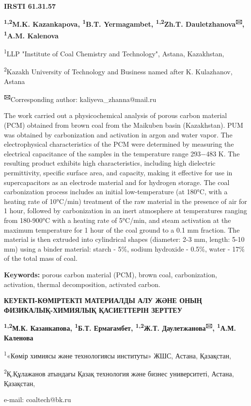 \newpage
{\bfseries IRSTI 61.31.57}


\begin{center}
{\bfseries \textsuperscript{1,2}M.K. Kazankapova, \textsuperscript{1}B.T. Yermagambet, \textsuperscript{1,2}Zh.T. Dauletzhanova\textsuperscript{🖂}, \textsuperscript{1}A.M. Kalenova}

\textsuperscript{1}LLP "Institute of Coal Chemistry and Technology",
Astana, Kazakhstan,

\textsuperscript{2}Kazakh University of Technology and Business named
after K. Kulazhanov, Astana

{\bfseries \textsuperscript{🖂}}Corresponding author:
kaliyeva\_zhanna@mail.ru
\end{center}

The work carried out a physicochemical analysis of porous carbon
material (PCM) obtained from brown coal from the Maikuben basin
(Kazakhstan). PUM was obtained by carbonization and activation in argon
and water vapor. The electrophysical characteristics of the PCM were
determined by measuring the electrical capacitance of the samples in the
temperature range 293−483 K. The resulting product exhibits high
characteristics, including high dielectric permittivity, specific
surface area, and capacity, making it effective for use in
supercapacitors as an electrode material and for hydrogen storage. The
coal carbonization process includes an initial low-temperature (at
180°C, with a heating rate of 10°C/min) treatment of the raw material in
the presence of air for 1 hour, followed by carbonization in an inert
atmosphere at temperatures ranging from 180-900°C with a heating rate of
5°C/min, and steam activation at the maximum temperature for 1 hour of
the coal ground to a 0.1 mm fraction. The material is then extruded into
cylindrical shapes (diameter: 2-3 mm, length: 5-10 mm) using a binder
material: starch - 5\%, sodium hydroxide - 0.5\%, water - 17\% of the
total mass of coal.

{\bfseries Keywords:} porous carbon material (PCM), brown coal,
carbonization, activation, thermal decomposition, activated carbon.

\begin{center}
{\large\bfseries КЕУЕКТІ-КӨМІРТЕКТІ МАТЕРИАЛДЫ АЛУ ЖӘНЕ ОНЫҢ ФИЗИКАЛЫҚ-ХИМИЯЛЫҚ
ҚАСИЕТТЕРІН ЗЕРТТЕУ}

{\bfseries \textsuperscript{1,2}М.К. Казанкапова, \textsuperscript{1}Б.Т. Ермағамбет, \textsuperscript{1,2}Ж.Т. Даулетжанова\textsuperscript{🖂}, \textsuperscript{1}А.М. Каленова}

\textsuperscript{1}«Көмір химиясы және технологиясы институты» ЖШС,
Астана, Қазақстан,

\textsuperscript{2}Қ.Құлажанов атындағы Қазақ технология және бизнес
университеті, Астана, Қазақстан,

e-mail: coaltech@bk.ru
\end{center}

